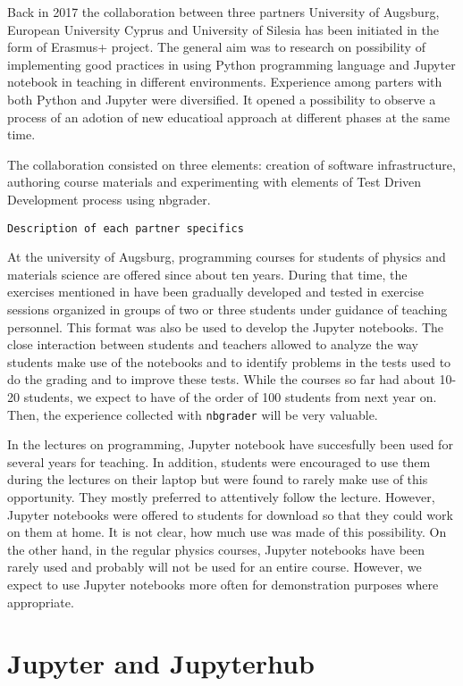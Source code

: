 \documentclass[twocolumn]{svjour3}          %
\begin{document}
Back in 2017 the collaboration between three partners University of
Augsburg, European University Cyprus and University of Silesia has
been initiated in the form of Erasmus+ project. The general aim was to
research on possibility of implementing good practices in using Python
programming language and Jupyter notebook in teaching in different
environments. Experience among parters with both Python and Jupyter
were diversified. It opened a possibility to observe a process of an
adotion of new educatioal approach at different phases at the same
time.

The collaboration consisted on three elements: creation of software
infrastructure, authoring course materials and experimenting with
elements of Test Driven Development process using nbgrader.


\texttt{Description of each partner specifics} 

At the university of Augsburg, programming courses for students of physics and
materials science are offered since about ten years. During that time, the
exercises mentioned in \label{sec:nbgrader} have been gradually developed and
tested in exercise sessions organized in groups of two or three students under
guidance of teaching personnel. This format was also be used to develop the
Jupyter notebooks. The close interaction between students and teachers allowed
to analyze the way students make use of the notebooks and to identify problems
in the tests used to do the grading and to improve these tests. While the courses
so far had about 10-20 students, we expect to have of the order of 100 students
from next year on. Then, the experience collected with \texttt{nbgrader} will
be very valuable.

In the lectures on programming, Jupyter notebook have succesfully been used for
several years for teaching. In addition, students were encouraged to use them
during the lectures on their laptop but were found to rarely make use of this
opportunity. They mostly preferred to attentively follow the lecture. However,
Jupyter notebooks were offered to students for download so that they could
work on them at home. It is not clear, how much use was made of this possibility.
On the other hand, in the regular physics courses, Jupyter notebooks have been
rarely used and probably will not be used for an entire course. However, we
expect to use Jupyter notebooks more often for demonstration purposes where
appropriate.

\section{Jupyter and Jupyterhub}
\label{sec:jupyter_jupyterhub}
\end{document}
